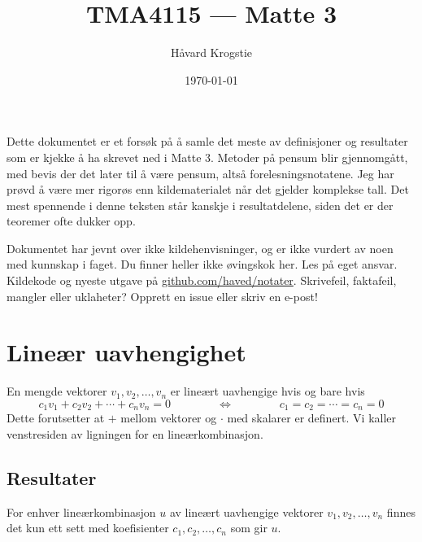 \documentclass[12pt,a4paper,norsk]{article}
\title{TMA4115 --- Matte 3}
\author{Håvard Krogstie\\\randomize{\lst{}.\fst{}@gmail.com}}
\date{\today}
\begin{document}
\maketitle

\noindent
Dette dokumentet er et forsøk på å samle det meste av definisjoner og resultater
som er kjekke å ha skrevet ned i Matte 3. Metoder på pensum blir gjennomgått,
med bevis der det later til å være pensum, altså forelesningsnotatene. Jeg har
prøvd å være mer rigorøs enn kildematerialet når det gjelder komplekse tall.
Det mest spennende i denne teksten står kanskje i resultatdelene, siden
det er der teoremer ofte dukker opp.

Dokumentet har jevnt over ikke kildehenvisninger, og er ikke vurdert av noen
med kunnskap i faget. Du finner heller ikke øvingskok her. Les på eget ansvar.
Kildekode og nyeste utgave på
\href{https://github.com/haved/notater/}{github.com/haved/notater}. Skrivefeil,
faktafeil, mangler eller uklaheter? Opprett en issue eller skriv en e-post!

\clearpage
\tableofcontents
\clearpage

\section{Lineær uavhengighet}
En mengde vektorer $v_{1}, v_{2}, \ldots, v_{n}$ er lineært uavhengige hvis og bare
hvis
\[c_{1}v_{1} + c_{2}v_{2} + \cdots + c_{n}v_{n} = 0 \hspace{4em} \Longleftrightarrow \hspace{4em} c_{1}=c_{2}=\cdots=c_{n}=0\]
Dette forutsetter at $+$ mellom vektorer og $\cdot$ med skalarer er definert. Vi
kaller venstresiden av ligningen for en lineærkombinasjon.

\subsection{Resultater}
For enhver lineærkombinasjon $u$ av lineært uavhengige vektorer
$v_{1}, v_{2}, \ldots, v_{n}$ finnes det kun ett sett med koefisienter
$c_{1}, c_{2}, \ldots, c_{n}$ som gir $u$.
\end{document}
